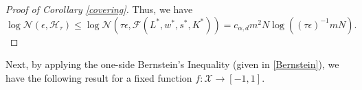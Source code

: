 \documentclass{article}
\newtheorem{lemma}{Lemma}
\begin{document}
\begin{proof}[Proof of Corollary \ref{covering}]
 Thus, we have 
     \begin{equation*}
        \log \mathcal{N}(\epsilon,\mathcal{H}_\tau) \leq \log \mathcal{N}(\tau\epsilon,\mathcal{F}(L^*,  w^*, s^*, K^*)) = c_{\alpha, d} m^2 N \log ((\tau\epsilon)^{-1}mN).
    \end{equation*}
\end{proof}


Next, by applying the one-side Bernstein's Inequality (given in \eqref{Bernstein}), we have the following result for a fixed function $f: {\mathcal X} \to [-1, 1]$.
\end{document}
